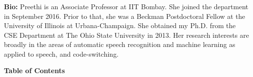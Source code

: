 \documentclass[11pt,oneside]{book}
\begin{document}
    \textbf{Bio:} Preethi is an Associate Professor at IIT Bombay. She joined the department in September 2016. Prior to that, she was a Beckman Postdoctoral Fellow at the University of Illinois at Urbana-Champaign. She obtained my Ph.D. from the CSE Department at The Ohio State University in 2013. Her research interests are broadly in the areas of automatic speech recognition and machine learning as applied to speech, and code-switching.
  \newpage
  



{}
\newpage  %
\pagestyle{plain}
\begin{center}
{\Large \textbf{Table of Contents}}
\end{center}
\vspace*{1em}
\newcommand\page[1]{\rightskip=25pt \dotfill\rlap{\hbox to 25pt{\hfill#1}}\par}
\end{document}
